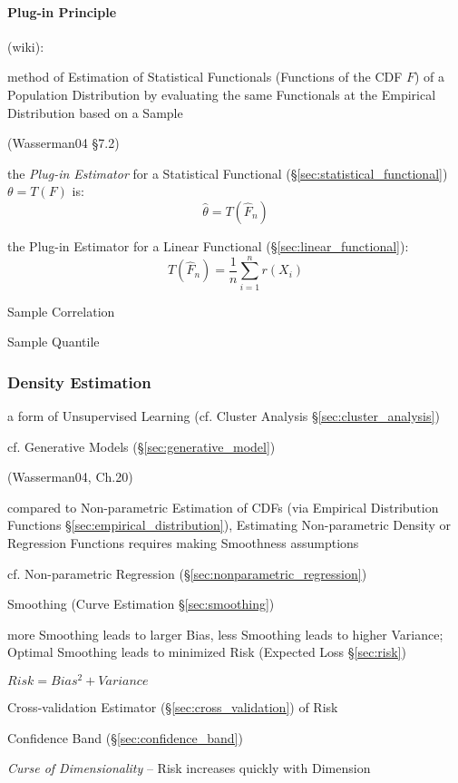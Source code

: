\paragraph{Plug-in Principle}\label{sec:plugin_principle}\hfill

(wiki):

method of Estimation of Statistical Functionals (Functions of the CDF $F$) of a
Population Distribution by evaluating the same Functionals at the Empirical
Distribution based on a Sample

(Wasserman04 \S7.2)

the \emph{Plug-in Estimator} for a Statistical Functional
(\S\ref{sec:statistical_functional}) $\theta = T(F)$ is:
\[
  \hat{\theta} = T(\hat{F}_n)
\]

the Plug-in Estimator for a Linear Functional (\S\ref{sec:linear_functional}):
\[
  T(\hat{F}_n) = \frac{1}{n}\sum_{i=1}^n r(X_i)
\]

Sample Correlation

Sample Quantile



\subsubsection{Density Estimation}\label{sec:density_estimation}

a form of Unsupervised Learning (cf. Cluster Analysis
\S\ref{sec:cluster_analysis})

\fist cf. Generative Models (\S\ref{sec:generative_model})

(Wasserman04, Ch.20)

compared to Non-parametric Estimation of CDFs (via Empirical Distribution
Functions \S\ref{sec:empirical_distribution}), Estimating Non-parametric Density
or Regression Functions requires making Smoothness assumptions

cf. Non-parametric Regression (\S\ref{sec:nonparametric_regression})

Smoothing (Curve Estimation \S\ref{sec:smoothing})

more Smoothing leads to larger Bias, less Smoothing leads to higher Variance;
Optimal Smoothing leads to minimized Risk (Expected Loss \S\ref{sec:risk})

$Risk = Bias^2 + Variance$

Cross-validation Estimator (\S\ref{sec:cross_validation}) of Risk

Confidence Band (\S\ref{sec:confidence_band})

\emph{Curse of Dimensionality} -- Risk increases quickly with Dimension

